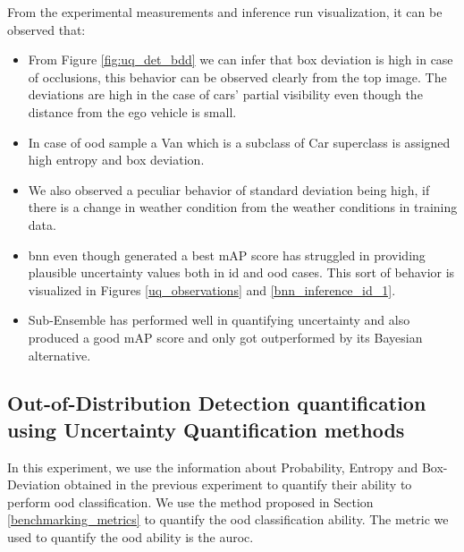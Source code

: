     From the experimental measurements and inference run visualization, it can be observed that:
    \begin{itemize}
        \item From Figure \ref{fig:uq_det_bdd} we can infer that box deviation is high in case of occlusions, this behavior can be observed clearly from the top image. The deviations are high in the case of cars' partial visibility even though the distance from the ego vehicle is small.
        \item In case of \acrshort{ood} sample a Van which is a subclass of Car superclass is assigned high entropy and box deviation.
        \item We also observed a peculiar behavior of standard deviation being high, if there is a change in weather condition from the weather conditions in training data.
        \item \acrshort{bnn} even though generated a best mAP score has struggled in providing plausible uncertainty values both in \acrshort{id} and \acrshort{ood} cases. This sort of behavior is visualized in Figures \ref{uq_observations} and \ref{bnn_inference_id_1}.
        \item Sub-Ensemble has performed well in quantifying uncertainty and also produced a good mAP score and only got outperformed by its Bayesian alternative.
    \end{itemize}
    
    \newpage

    \subsection{Out-of-Distribution Detection quantification using Uncertainty Quantification methods}
    \label{Exp:4}
    In this experiment, we use the information about Probability, Entropy and Box-Deviation obtained in the previous experiment to quantify their ability to perform \acrshort{ood} classification. We use the method proposed in Section \ref{benchmarking_metrics} to quantify the \acrshort{ood} classification ability. The metric we used to quantify the \acrshort{ood} ability is the \acrlong{auroc}.
    
